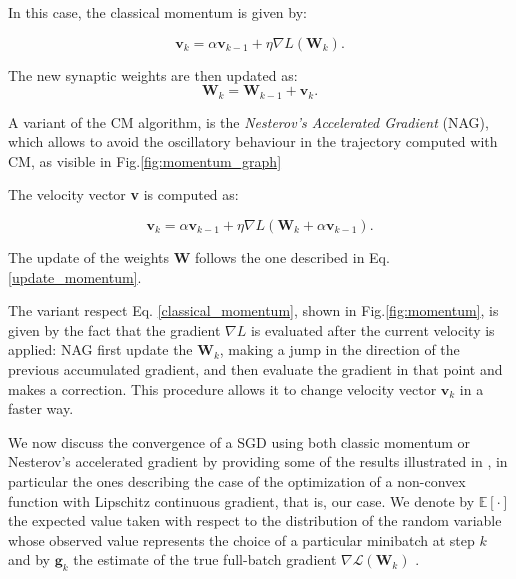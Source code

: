 			In this case, the classical momentum is given by:

			\begin{equation}
				\label{classical_momentum}
				\textbf{v}_k = \alpha\textbf{v}_{k-1} + \eta\nabla\textit{L}(\textbf{W}_k).
			\end{equation}

			The new synaptic weights are then updated as:
			\begin{equation}
				\label{update_momentum}
				\textbf{W}_k = \textbf{W}_{k-1}  + \textbf{v}_k.
			\end{equation}

			A variant of the CM algorithm, is the \textit{Nesterov's Accelerated Gradient} (NAG), which allows to avoid the oscillatory behaviour in the trajectory computed with CM, as visible in Fig.\ref{fig:momentum_graph}%

			The velocity vector \textbf{v} is computed as:

			\begin{equation}
				\label{nesterov_momentum}
				\textbf{v}_k = \alpha\textbf{v}_{k-1} + \eta\nabla\textit{L}(\textbf{W}_k + \alpha\textbf{v}_{k-1}).
			\end{equation}

			The update of the weights \textbf{W} follows the one described in Eq. \ref{update_momentum}.

			The variant respect Eq. \ref{classical_momentum}, shown in Fig.\ref{fig:momentum}, is given by the fact that the gradient $\nabla\textit{L}$ is evaluated after the current velocity is applied: NAG first update the $\textbf{W}_k$, making a jump in the direction of the previous accumulated gradient, and then evaluate the gradient in that point and makes a correction. This procedure allows it to change velocity vector $\textbf{v}_{k}$ in a faster way.

			We now discuss the convergence of a SGD using both classic momentum or Nesterov's accelerated
			gradient by providing some of the results illustrated in \cite{unified_convergence}, in particular
			the ones describing the case of the optimization of a non-convex function
			with Lipschitz continuous gradient, that is, our case.
			We denote by $\mathbb{E}[\cdot]$ the expected value taken with respect to the distribution of the
			random variable whose observed value represents the choice of a particular minibatch at step $k$ and by
			$\mathbf{g}_{k}$ the estimate of the true full-batch gradient $\nabla \mathcal{L}(\textbf{W}_{k})$ .

